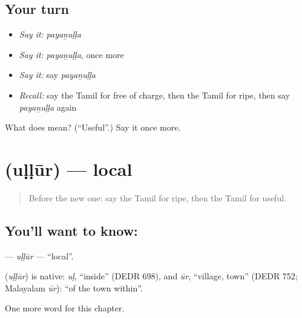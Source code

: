 \subsection*{Your turn}
\begin{itemize}
\raggedright
  \item \emph{Say it:} \emph{payaṉuḷḷa}
  \item \emph{Say it:} \emph{payaṉuḷḷa}, once more
  \item \emph{Say it:} say \emph{payaṉuḷḷa}
  \item \emph{Recall:} say the Tamil for free of charge, then the Tamil for ripe, then say \emph{payaṉuḷḷa} again
\end{itemize}

\begin{tcolorbox}[breakable,colback=teal!4,colframe=teal!35!black,title={Before you move on}]
What does  mean? (\textquotedblleft{}Useful\textquotedblright{}.) Say it once more.
\end{tcolorbox}
\section[\texorpdfstring{\ta{உள்ளூர்} (uḷḷūr)}{உள்ளூர் (uḷḷūr)}]{ (uḷḷūr) — local}

\label{lesson:TA-C179-ullur}



\begin{quote}
Before the new one: say the Tamil for ripe, then the Tamil for useful.
\end{quote}

\subsection*{You'll want to know: }
\textbf{} — \emph{uḷḷūr} — \textquotedblleft{}local\textquotedblright{}.

\begin{cousinweb}
\textbf{} (\emph{uḷḷūr}) is native: \emph{uḷ}, \textquotedblleft{}inside\textquotedblright{} (DEDR 698), and \emph{ūr}, \textquotedblleft{}village, town\textquotedblright{} (DEDR 752; Malayalam \emph{ūr}): \textquotedblleft{}of the town within\textquotedblright{}.
\end{cousinweb}

\begin{grammarlens}[title={What you've built}]
One more word for this chapter.
\end{grammarlens}

